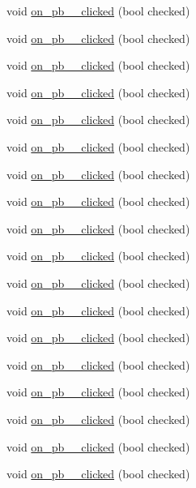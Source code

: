 \begin{DoxyCompactItemize}
\item 
void \hyperlink{class_q_particle_selector_aba68bd4d35a15b2ed3f701f0fa4f2bfd}{on\+\_\+pb\+\_\+\_\+clicked} (bool checked)
\item 
void \hyperlink{class_q_particle_selector_a1fbc0e7f1df72ee334d9877a98966285}{on\+\_\+pb\+\_\+\_\+clicked} (bool checked)
\item 
void \hyperlink{class_q_particle_selector_a91a4d1eb835be6e238220188653fda2f}{on\+\_\+pb\+\_\+\_\+clicked} (bool checked)
\item 
void \hyperlink{class_q_particle_selector_ac890967c44a09dc1ee86c695f63b8669}{on\+\_\+pb\+\_\+\_\+clicked} (bool checked)
\item 
void \hyperlink{class_q_particle_selector_af34569174a7e169cb6ad5d4885d3ca03}{on\+\_\+pb\+\_\+\_\+clicked} (bool checked)
\item 
void \hyperlink{class_q_particle_selector_ad5d9d3c5c15f5ef7d9092050c9ac0605}{on\+\_\+pb\+\_\+\_\+clicked} (bool checked)
\item 
void \hyperlink{class_q_particle_selector_aec22e6856b1843f908d0c8c91d7cc6a2}{on\+\_\+pb\+\_\+\_\+clicked} (bool checked)
\item 
void \hyperlink{class_q_particle_selector_a3090ac1884e50099892a858f1ab6ed49}{on\+\_\+pb\+\_\+\_\+clicked} (bool checked)
\item 
void \hyperlink{class_q_particle_selector_a0c4331be0e9768977484c994cc12be3f}{on\+\_\+pb\+\_\+\_\+clicked} (bool checked)
\item 
void \hyperlink{class_q_particle_selector_a79857d47ec9fcd6335c212e1716da9e8}{on\+\_\+pb\+\_\+\_\+clicked} (bool checked)
\item 
void \hyperlink{class_q_particle_selector_adb4c0bfb05e06d1836e2efcea670c313}{on\+\_\+pb\+\_\+\_\+clicked} (bool checked)
\item 
void \hyperlink{class_q_particle_selector_af9df7fa0e88957f393e44d8094335ba8}{on\+\_\+pb\+\_\+\_\+clicked} (bool checked)
\item 
void \hyperlink{class_q_particle_selector_a334b8722c5697bbc2797d126c74622df}{on\+\_\+pb\+\_\+\_\+clicked} (bool checked)
\item 
void \hyperlink{class_q_particle_selector_a83d819f119feba5cc774c469b20217a0}{on\+\_\+pb\+\_\+\_\+clicked} (bool checked)
\item 
void \hyperlink{class_q_particle_selector_a3490c642b91a205d7f5d46d374c8f231}{on\+\_\+pb\+\_\+\_\+clicked} (bool checked)
\item 
void \hyperlink{class_q_particle_selector_a10b1561ccbed76443f4544c34d8cf49b}{on\+\_\+pb\+\_\+\_\+clicked} (bool checked)
\item 
void \hyperlink{class_q_particle_selector_a140809a6b17a98efdc64aea3b223b89b}{on\+\_\+pb\+\_\+\_\+clicked} (bool checked)
\item 
void \hyperlink{class_q_particle_selector_a1cac4a0543af7ab335a44730cd04fc76}{on\+\_\+pb\+\_\+\_\+clicked} (bool checked)
\end{DoxyCompactItemize}
